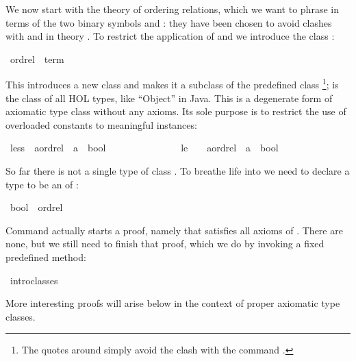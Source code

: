 %
\begin{isabellebody}%
\def\isabellecontext{Overloading{\isadigit{1}}}%
%
%
\begin{isamarkuptext}%
We now start with the theory of ordering relations, which we want to phrase
in terms of the two binary symbols \isa{{\isacharless}{\isacharless}} and \isa{{\isacharless}{\isacharless}{\isacharequal}}: they have
been chosen to avoid clashes with \isa{{\isacharless}} and \isa{{\isasymle}} in theory . To restrict the application of \isa{{\isacharless}{\isacharless}} and \isa{{\isacharless}{\isacharless}{\isacharequal}} we
introduce the class :%
\end{isamarkuptext}%
\ ordrel\ {\isacharless}\ {\isachardoublequote}term{\isachardoublequote}%
\begin{isamarkuptext}%
\noindent
This introduces a new class  and makes it a subclass of
the predefined class \footnote{The quotes around 
simply avoid the clash with the command .}; 
is the class of all HOL types, like ``Object'' in Java.
This is a degenerate form of axiomatic type class without any axioms.
Its sole purpose is to restrict the use of overloaded constants to meaningful
instances:%
\end{isamarkuptext}%
\ less\ {\isacharcolon}{\isacharcolon}\ {\isachardoublequote}{\isacharparenleft}{\isacharprime}a{\isacharcolon}{\isacharcolon}ordrel{\isacharparenright}\ {\isasymRightarrow}\ {\isacharprime}a\ {\isasymRightarrow}\ bool{\isachardoublequote}\ \ \ \ \ {\isacharparenleft}\ {\isachardoublequote}{\isacharless}{\isacharless}{\isachardoublequote}\ \ {}{}{\isacharparenright}\isanewline
\ \ \ \ \ \ \ le\ \ \ {\isacharcolon}{\isacharcolon}\ {\isachardoublequote}{\isacharparenleft}{\isacharprime}a{\isacharcolon}{\isacharcolon}ordrel{\isacharparenright}\ {\isasymRightarrow}\ {\isacharprime}a\ {\isasymRightarrow}\ bool{\isachardoublequote}\ \ \ \ \ {\isacharparenleft}\ {\isachardoublequote}{\isacharless}{\isacharless}{\isacharequal}{\isachardoublequote}\ {}{}{\isacharparenright}%
\begin{isamarkuptext}%
\noindent
So far there is not a single type of class . To breathe life
into  we need to declare a type to be an  of
:%
\end{isamarkuptext}%
\ bool\ {\isacharcolon}{\isacharcolon}\ ordrel%
\begin{isamarkuptxt}%
\noindent
Command  actually starts a proof, namely that
 satisfies all axioms of .
There are none, but we still need to finish that proof, which we do
by invoking a fixed predefined method:%
\end{isamarkuptxt}%
\ intro{\isacharunderscore}classes%
\begin{isamarkuptext}%
\noindent
More interesting  proofs will arise below
in the context of proper axiomatic type classes.


\end{isamarkuptext}
\end{isabellebody}
